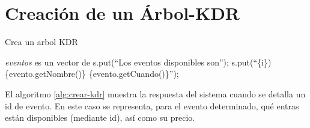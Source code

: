 \section{Creación de un Árbol-KDR}

\begin{algorithm}
\caption{Crea un arbol KDR}
\label{alg:crear-kdr}
\begin{algorithmic}[1]
	\Require \emph{eventos} es un vector de 
\State s.put(``Los eventos disponibles son'');
	\State s.put(``\{i\}) \{evento.getNombre()\} \{evento.getCuando()\}'');
\EndFor
\EndProcedure
\end{algorithmic}
\end{algorithm}

El algoritmo \ref{alg:crear-kdr} muestra la respuesta del sistema cuando se detalla un id de evento.
En este caso se representa, para el evento determinado, qué entras están disponibles (mediante id),
    así como su precio.